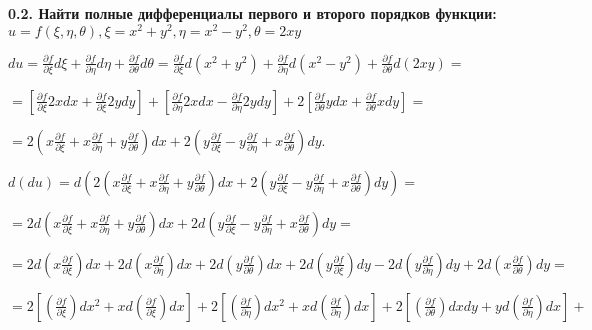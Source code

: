 \documentclass{article}
\begin{document}
\noindent \textbf{0.2. Найти полные дифференциалы первого и второго порядков функции:
$u = f(\xi, \eta, \theta), \xi = x^2 + y^2, \eta = x^2 - y^2, \theta = 2xy$}
\vspace{3mm} 

\noindent $d u = \frac{\partial f}{\partial \xi}d \xi + \frac{\partial f}{\partial \eta} d \eta + \frac{\partial f}{\partial \theta}d \theta = \frac{\partial f}{\partial \xi}d (x^2+y^2) + \frac{\partial f}{\partial \eta} d (x^2-y^2) + \frac{\partial f}{\partial \theta}d (2xy) =$\vspace{1mm}

\noindent$=[\frac{\partial f}{\partial \xi}2xdx + \frac{\partial f}{\partial \xi}2ydy]  + [\frac{\partial f}{\partial \eta} 2xdx - \frac{\partial f}{\partial \eta} 2ydy] + 2[\frac{\partial f}{\partial \theta}ydx + \frac{\partial f}{\partial \theta}xdy] =$\vspace{1mm}

\noindent$ = 2(x\frac{\partial f}{\partial \xi} + x\frac{\partial f}{\partial \eta} + y \frac{\partial f}{\partial \theta})dx + 2(y\frac{\partial f}{\partial \xi} - y\frac{\partial f}{\partial \eta} + x\frac{\partial f}{\partial \theta} )dy$.\vspace{3mm}

\noindent$d(du) = d(2(x\frac{\partial f}{\partial \xi} + x\frac{\partial f}{\partial \eta} + y \frac{\partial f}{\partial \theta})dx + 2(y\frac{\partial f}{\partial \xi} - y\frac{\partial f}{\partial \eta} + x\frac{\partial f}{\partial \theta} )dy)=$\vspace{1mm}

\noindent$= 2d(x\frac{\partial f}{\partial \xi} + x\frac{\partial f}{\partial \eta} + y \frac{\partial f}{\partial \theta})dx + 2d(y\frac{\partial f}{\partial \xi} - y\frac{\partial f}{\partial \eta} + x\frac{\partial f}{\partial \theta} )dy=$\vspace{1mm}

\noindent$= 2d(x\frac{\partial f}{\partial \xi})dx + 2d(x\frac{\partial f}{\partial \eta})dx + 2d(y \frac{\partial f}{\partial \theta})dx +  2d(y\frac{\partial f}{\partial \xi})dy - 2d(y\frac{\partial f}{\partial \eta})dy + 2d(x\frac{\partial f}{\partial \theta} )dy=$\vspace{1mm}

\noindent$ = 2[(\frac{\partial f}{\partial \xi})dx^2 + xd(\frac{\partial f}{\partial \xi})dx] + 2[(\frac{\partial f}{\partial \eta})dx^2 + xd(\frac{\partial f}{\partial \eta})dx] + 2[(\frac{\partial f}{\partial \theta})dxdy + yd(\frac{\partial f}{\partial \eta})dx]+$\vspace{1mm}
\end{document}
